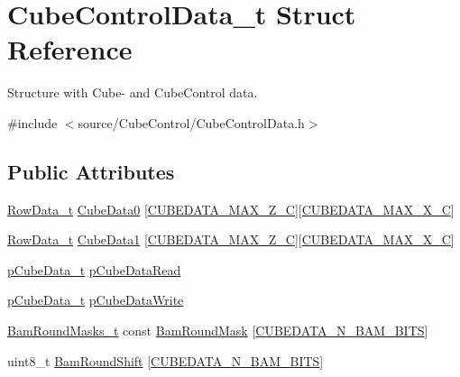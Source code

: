 \hypertarget{struct_cube_control_data__t}{}\section{Cube\+Control\+Data\+\_\+t Struct Reference}
\label{struct_cube_control_data__t}


Structure with Cube-\/ and Cube\+Control data.  




{\ttfamily \#include $<$source/\+Cube\+Control/\+Cube\+Control\+Data.\+h$>$}

\subsection*{Public Attributes}
\begin{DoxyCompactItemize}
\item 
\hyperlink{struct_row_data__t}{Row\+Data\+\_\+t} \hyperlink{struct_cube_control_data__t_a4fcbd72fab1f862e17acc3f96efe8d4c}{Cube\+Data0} \mbox{[}\hyperlink{_cube_control_data_8h_af8a3cd66f1181d1c4119a4e51a4015f8}{C\+U\+B\+E\+D\+A\+T\+A\+\_\+\+M\+A\+X\+\_\+\+Z\+\_\+\+C}\mbox{]}\mbox{[}\hyperlink{_cube_control_data_8h_aaf8754e50e21c648edd86850eedb5a63}{C\+U\+B\+E\+D\+A\+T\+A\+\_\+\+M\+A\+X\+\_\+\+X\+\_\+\+C}\mbox{]}
\item 
\hyperlink{struct_row_data__t}{Row\+Data\+\_\+t} \hyperlink{struct_cube_control_data__t_a647ae59f9e5f0842d92ef0241db2a141}{Cube\+Data1} \mbox{[}\hyperlink{_cube_control_data_8h_af8a3cd66f1181d1c4119a4e51a4015f8}{C\+U\+B\+E\+D\+A\+T\+A\+\_\+\+M\+A\+X\+\_\+\+Z\+\_\+\+C}\mbox{]}\mbox{[}\hyperlink{_cube_control_data_8h_aaf8754e50e21c648edd86850eedb5a63}{C\+U\+B\+E\+D\+A\+T\+A\+\_\+\+M\+A\+X\+\_\+\+X\+\_\+\+C}\mbox{]}
\item 
\hyperlink{struct_row_data__t}{p\+Cube\+Data\+\_\+t} \hyperlink{struct_cube_control_data__t_a981fbbdd6a05af493c7ae6782bdcb9af}{p\+Cube\+Data\+Read}
\item 
\hyperlink{struct_row_data__t}{p\+Cube\+Data\+\_\+t} \hyperlink{struct_cube_control_data__t_aa60f6c5f56c138fba459e0a990248e0f}{p\+Cube\+Data\+Write}
\item 
\hyperlink{_cube_control_data_8h_a2b6850a8815b785ea51f17c4d979706e}{Bam\+Round\+Masks\+\_\+t} const \hyperlink{struct_cube_control_data__t_a27e68e649dcb5beced5b6b7c92419ec5}{Bam\+Round\+Mask} \mbox{[}\hyperlink{_cube_control_data_8h_ae8163b1995363e0daae4ac54ee4d1dd9}{C\+U\+B\+E\+D\+A\+T\+A\+\_\+\+N\+\_\+\+B\+A\+M\+\_\+\+B\+I\+T\+S}\mbox{]}
\item 
uint8\+\_\+t \hyperlink{struct_cube_control_data__t_a945206c33a16ec4249c30e2b698dccff}{Bam\+Round\+Shift} \mbox{[}\hyperlink{_cube_control_data_8h_ae8163b1995363e0daae4ac54ee4d1dd9}{C\+U\+B\+E\+D\+A\+T\+A\+\_\+\+N\+\_\+\+B\+A\+M\+\_\+\+B\+I\+T\+S}\mbox{]}
\end{DoxyCompactItemize}


